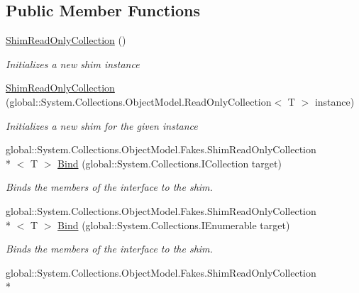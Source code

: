 \subsection*{Public Member Functions}
\begin{DoxyCompactItemize}
\item 
\hyperlink{class_system_1_1_collections_1_1_object_model_1_1_fakes_1_1_shim_read_only_collection_3_01_t_01_4_a0de9e52db4521fdfe29fd0a7918532c7}{Shim\-Read\-Only\-Collection} ()
\begin{DoxyCompactList}\small\item\em Initializes a new shim instance\end{DoxyCompactList}\item 
\hyperlink{class_system_1_1_collections_1_1_object_model_1_1_fakes_1_1_shim_read_only_collection_3_01_t_01_4_afef22891f07b2ecebde815597ba48c7a}{Shim\-Read\-Only\-Collection} (global\-::\-System.\-Collections.\-Object\-Model.\-Read\-Only\-Collection$<$ T $>$ instance)
\begin{DoxyCompactList}\small\item\em Initializes a new shim for the given instance\end{DoxyCompactList}\item 
global\-::\-System.\-Collections.\-Object\-Model.\-Fakes.\-Shim\-Read\-Only\-Collection\\*
$<$ T $>$ \hyperlink{class_system_1_1_collections_1_1_object_model_1_1_fakes_1_1_shim_read_only_collection_3_01_t_01_4_a9df8904b6b8e1fd2751e3c9285f6c77d}{Bind} (global\-::\-System.\-Collections.\-I\-Collection target)
\begin{DoxyCompactList}\small\item\em Binds the members of the interface to the shim.\end{DoxyCompactList}\item 
global\-::\-System.\-Collections.\-Object\-Model.\-Fakes.\-Shim\-Read\-Only\-Collection\\*
$<$ T $>$ \hyperlink{class_system_1_1_collections_1_1_object_model_1_1_fakes_1_1_shim_read_only_collection_3_01_t_01_4_ab236c362f69ea77b35b162e744596b4d}{Bind} (global\-::\-System.\-Collections.\-I\-Enumerable target)
\begin{DoxyCompactList}\small\item\em Binds the members of the interface to the shim.\end{DoxyCompactList}\item 
global\-::\-System.\-Collections.\-Object\-Model.\-Fakes.\-Shim\-Read\-Only\-Collection\\*

\end{DoxyCompactItemize}
